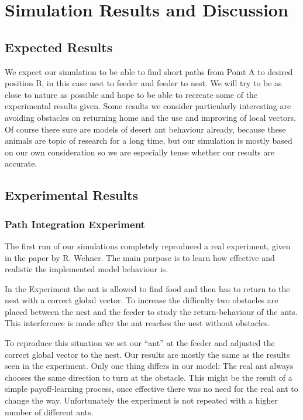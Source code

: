 \documentclass[11pt]{article}
\begin{document}
\newpage
\section{Simulation Results and Discussion}
\subsection{Expected Results}
We expect our simulation to be able to find short paths from Point A to desired position B, in this case nest to feeder and feeder to nest. We will try to be as close to nature as possible and hope to be able to recreate some of the experimental results given. Some results we consider particularly interesting are avoiding obstacles on returning home and the use and improving of local vectors. Of course there sure are models of desert ant behaviour already, because these animals are topic of research for a long time, but our simulation is mostly based on our own consideration so we are especially tense whether our results are accurate.
\subsection{Experimental Results}
\subsubsection{Path Integration Experiment}
The first run of our simulations completely reproduced a real experiment, given in the paper by R. Wehner\cite{wehner03}. The main purpose is to learn how effective and realistic the implemented model behaviour is.

In the Experiment the ant is allowed to find food and then has to return to the nest with a correct global vector. To increase the difficulty two obstacles are placed between the nest and the feeder to study the return-behaviour of the ants. This interference is made after the ant reaches the nest without obstacles.

To reproduce this situation we set our “ant” at the feeder and adjusted the correct global vector to the nest. Our results are mostly the same as the results seen in the experiment. Only one thing differs in our model: The real ant always chooses the same direction to turn at the obstacle. This might be the result of a simple payoff-learning process, once effective there was no need for the real ant to change the way. Unfortunately the experiment is not repeated with a higher number of different ants.
\end{document}
